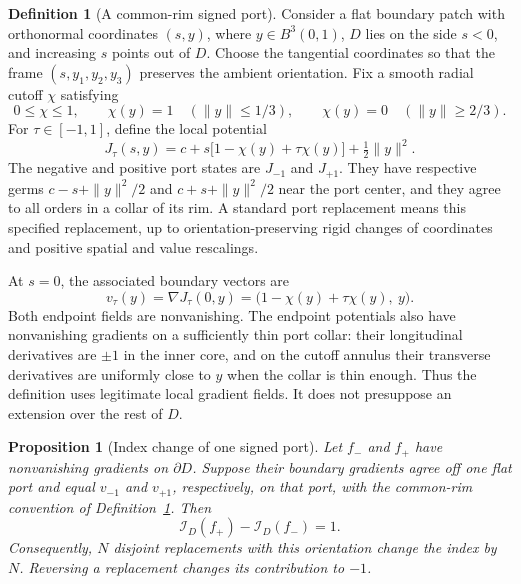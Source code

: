 \documentclass[11pt,a4paper]{article}
\newtheorem{proposition}[theorem]{Proposition}
\theoremstyle{definition}
\newtheorem{definition}[theorem]{Definition}
\theoremstyle{remark}
\begin{document}
\begin{definition}[A common-rim signed port]
\label{def:common-rim-port}
Consider a flat boundary patch with orthonormal coordinates $(s,y)$,
where $y\in B^3(0,1)$, $D$ lies on the side $s<0$, and increasing $s$
points out of $D$.  Choose the tangential coordinates so that the frame
$(s,y_1,y_2,y_3)$ preserves the ambient orientation.  Fix a smooth radial
cutoff $\chi$ satisfying
\[
 0\le\chi\le1,\qquad
 \chi(y)=1\quad(\|y\|\le1/3),\qquad
 \chi(y)=0\quad(\|y\|\ge2/3).
\]
For $\tau\in[-1,1]$, define the local potential
\begin{equation}
 J_\tau(s,y)
   =c+s\bigl[1-\chi(y)+\tau\chi(y)\bigr]
                 +\tfrac12\|y\|^2.
 \label{eq:completed-signed-germ}
\end{equation}
The negative and positive port states are $J_{-1}$ and $J_{+1}$.
They have respective germs $c-s+\|y\|^2/2$ and
$c+s+\|y\|^2/2$ near the port center, and they agree to all orders in a
collar of its rim.  A standard port replacement means this specified
replacement, up to orientation-preserving rigid changes of coordinates and
positive spatial and value rescalings.
\end{definition}

At $s=0$, the associated boundary vectors are
\begin{equation}
 v_\tau(y)=\nabla J_\tau(0,y)
       =\bigl(1-\chi(y)+\tau\chi(y),\ y\bigr).
 \label{eq:port-boundary-homotopy}
\end{equation}
Both endpoint fields are nonvanishing.  The endpoint potentials also have
nonvanishing gradients on a sufficiently thin port collar: their
longitudinal derivatives are $\pm1$ in the inner core, and on the cutoff
annulus their transverse derivatives are uniformly close to $y$ when
the collar is thin enough.  Thus the definition uses legitimate local
gradient fields.  It does not presuppose an extension over the rest of
$D$.

\begin{proposition}[Index change of one signed port]
\label{prop:signed-port-index}
Let $f_-$ and $f_+$ have nonvanishing gradients on $\partial D$.
Suppose their boundary gradients agree off one flat port and equal
$v_{-1}$ and $v_{+1}$, respectively, on that port, with the common-rim
convention of Definition~\ref{def:common-rim-port}.  Then
\begin{equation}
 \mathcal I_D(f_+)-\mathcal I_D(f_-)=1.
 \label{eq:single-port-index-change}
\end{equation}
Consequently, $N$ disjoint replacements with this orientation change the
index by $N$.  Reversing a replacement changes its contribution to $-1$.
\end{proposition}
\end{document}
